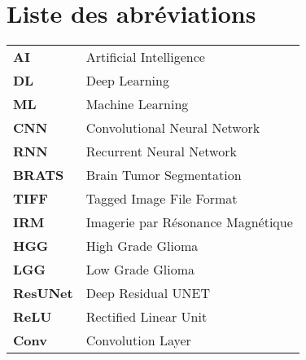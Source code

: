 \chapter*{Liste des abréviations}
\lhead{}
\begin{tabular}{ll}
\textbf{AI} & Artificial Intelligence  \\
\textbf{DL} & Deep Learning  \\
\textbf{ML} & Machine Learning  \\
\textbf{CNN} & Convolutional Neural Network  \\
\textbf{RNN} & Recurrent Neural Network \\
\textbf{BRATS} & Brain Tumor Segmentation  \\
\textbf{TIFF} & Tagged Image File Format  \\
\textbf{IRM} & Imagerie par Résonance Magnétique  \\
\textbf{HGG} & High Grade Glioma  \\
\textbf{LGG} & Low Grade Glioma  \\
\textbf{ResUNet} & Deep Residual UNET  \\
\textbf{ReLU} & Rectified Linear Unit  \\
\textbf{Conv} & Convolution Layer  \\
\end{tabular}